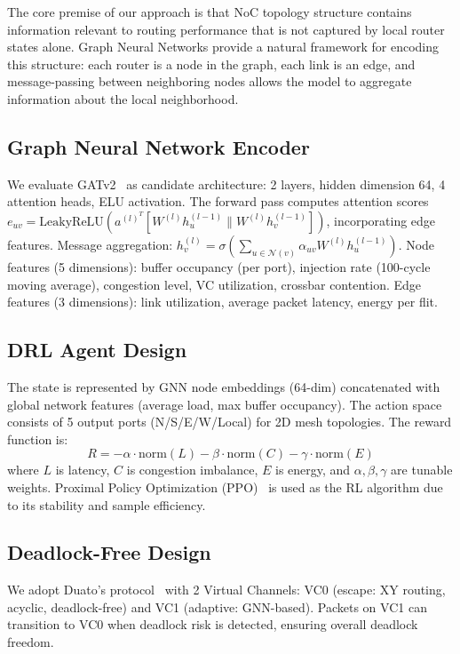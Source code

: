 \documentclass[conference]{IEEEtran}
\begin{document}
The core premise of our approach is that NoC topology structure contains information relevant to routing performance that is not captured by local router states alone. Graph Neural Networks provide a natural framework for encoding this structure: each router is a node in the graph, each link is an edge, and message-passing between neighboring nodes allows the model to aggregate information about the local neighborhood.

\subsection{Graph Neural Network Encoder}

We evaluate GATv2~\cite{gatv2} as candidate architecture: 2 layers, hidden dimension 64, 4 attention heads, ELU activation. The forward pass computes attention scores $e_{uv} = \text{LeakyReLU}(a^{(l)^T}[W^{(l)}h_u^{(l-1)}\parallel W^{(l)}h_v^{(l-1)}])$, incorporating edge features. Message aggregation: $h_v^{(l)} = \sigma(\sum_{u\in\mathcal{N}(v)} \alpha_{uv}W^{(l)}h_u^{(l-1)})$. Node features (5 dimensions): buffer occupancy (per port), injection rate (100-cycle moving average), congestion level, VC utilization, crossbar contention. Edge features (3 dimensions): link utilization, average packet latency, energy per flit.

\subsection{DRL Agent Design}

The state is represented by GNN node embeddings (64-dim) concatenated with global network features (average load, max buffer occupancy). The action space consists of 5 output ports (N/S/E/W/Local) for 2D mesh topologies. The reward function is:
\begin{equation}
R = -\alpha\cdot\text{norm}(L) - \beta\cdot\text{norm}(C) - \gamma\cdot\text{norm}(E)
\label{eq:reward}
\end{equation}
where $L$ is latency, $C$ is congestion imbalance, $E$ is energy, and $\alpha,\beta,\gamma$ are tunable weights. Proximal Policy Optimization (PPO)~\cite{ppo2017} is used as the RL algorithm due to its stability and sample efficiency.

\subsection{Deadlock-Free Design}

We adopt Duato's protocol~\cite{duato1996} with 2 Virtual Channels: VC0 (escape: XY routing, acyclic, deadlock-free) and VC1 (adaptive: GNN-based). Packets on VC1 can transition to VC0 when deadlock risk is detected, ensuring overall deadlock freedom.
\end{document}
